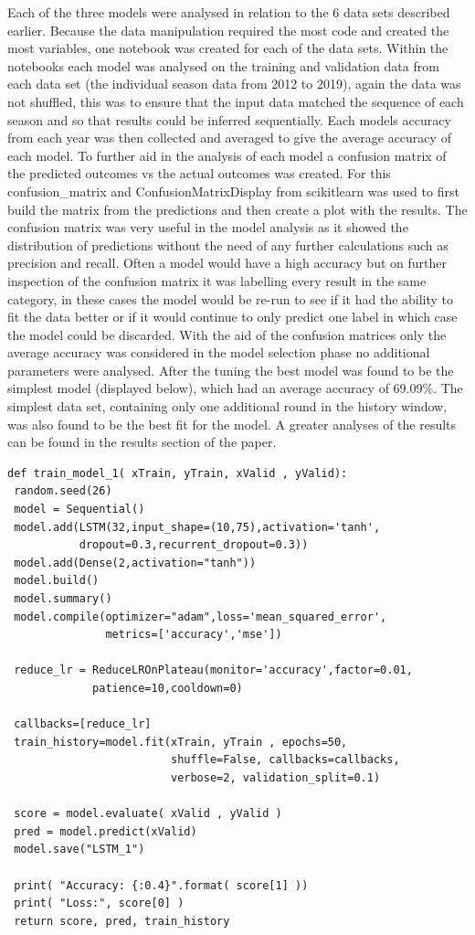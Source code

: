 \documentclass{imc-inf}
\begin{document}
	Each of the three models were analysed in relation to the 6 data sets described earlier. Because the data manipulation required the most code and created the most variables, one notebook was created for each of the data sets. Within the notebooks each model was analysed on the training and validation data from each data set (the individual season data from 2012 to 2019), again the data was not shuffled, this was to ensure that the input data matched the sequence of each season and so that results could be inferred sequentially. Each models accuracy from each year was then collected and averaged to give the average accuracy of each model. 
	To further aid in the analysis of each model a confusion matrix of the predicted outcomes vs the actual outcomes was created. For this confusion\_matrix and ConfusionMatrixDisplay from scikitlearn was used to first build the matrix from the predictions and then create a plot with the results. The confusion matrix was very useful in the model analysis as it showed the distribution of predictions without the need of any further calculations such as precision and recall. Often a model would have a high accuracy but on further inspection of the confusion matrix it was labelling every result in the same category, in these cases the model would be re-run to see if it had the ability to fit the data better or if it would continue to only predict one label in which case the model could be discarded.
	With the aid of the confusion matrices only the average accuracy was considered in the model selection phase no additional parameters were analysed. After the tuning the best model was found to be the simplest model (displayed below), which had an average accuracy of 69.09\%. The simplest data set, containing only one additional round in the history window, was also found to be the best fit for the model. A greater analyses of the results can be found in the results section of the paper. 
\begin{lstlisting}
def train_model_1( xTrain, yTrain, xValid , yValid):
 random.seed(26)
 model = Sequential()
 model.add(LSTM(32,input_shape=(10,75),activation='tanh',
           dropout=0.3,recurrent_dropout=0.3))
 model.add(Dense(2,activation="tanh"))
 model.build()   
 model.summary()
 model.compile(optimizer="adam",loss='mean_squared_error',
               metrics=['accuracy','mse'])

 reduce_lr = ReduceLROnPlateau(monitor='accuracy',factor=0.01,
             patience=10,cooldown=0)

 callbacks=[reduce_lr]
 train_history=model.fit(xTrain, yTrain , epochs=50, 
                         shuffle=False, callbacks=callbacks,
                         verbose=2, validation_split=0.1)

 score = model.evaluate( xValid , yValid )
 pred = model.predict(xValid)
 model.save("LSTM_1")

 print( "Accuracy: {:0.4}".format( score[1] ))
 print( "Loss:", score[0] )
 return score, pred, train_history
	
\end{lstlisting}
	
\end{document}
